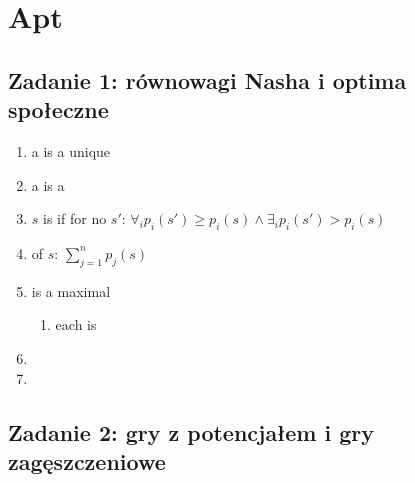 \section{Apt}

\subsection{Zadanie 1: równowagi Nasha i optima społeczne}

\begin{enumerate}

  \item a
    is a unique

  \item
    a
    is a

  \item
    $s$ is
    if for no $s'$:
    $
    \forall_i p_i(s') \geq p_i(s)
    \wedge
    \exists_i p_i(s') > p_i(s)
    $

  \item
    of $s$: $\sum^n_{j=1}p_j(s)$

  \item
    is a maximal

    \begin{enumerate}
      \item
        each
        is
    \end{enumerate}

  \item

  \item

\end{enumerate}

\subsection{Zadanie 2: gry z potencjałem i gry zagęszczeniowe}

